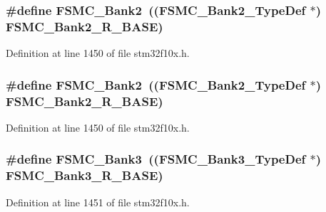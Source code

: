 \subsubsection[{\texorpdfstring{F\+S\+M\+C\+\_\+\+Bank2}{FSMC_Bank2}}]{\setlength{\rightskip}{0pt plus 5cm}\#define F\+S\+M\+C\+\_\+\+Bank2~(({\bf F\+S\+M\+C\+\_\+\+Bank2\+\_\+\+Type\+Def} $\ast$) {\bf F\+S\+M\+C\+\_\+\+Bank2\+\_\+\+R\+\_\+\+B\+A\+SE})}\hypertarget{group___peripheral__declaration_gabb3dfb5e88694aa2983ecabd33a55e0a}{}\label{group___peripheral__declaration_gabb3dfb5e88694aa2983ecabd33a55e0a}


Definition at line 1450 of file stm32f10x.\+h.

\subsubsection[{\texorpdfstring{F\+S\+M\+C\+\_\+\+Bank2}{FSMC_Bank2}}]{\setlength{\rightskip}{0pt plus 5cm}\#define F\+S\+M\+C\+\_\+\+Bank2~(({\bf F\+S\+M\+C\+\_\+\+Bank2\+\_\+\+Type\+Def} $\ast$) {\bf F\+S\+M\+C\+\_\+\+Bank2\+\_\+\+R\+\_\+\+B\+A\+SE})}\hypertarget{group___peripheral__declaration_gabb3dfb5e88694aa2983ecabd33a55e0a}{}\label{group___peripheral__declaration_gabb3dfb5e88694aa2983ecabd33a55e0a}


Definition at line 1450 of file stm32f10x.\+h.

\subsubsection[{\texorpdfstring{F\+S\+M\+C\+\_\+\+Bank3}{FSMC_Bank3}}]{\setlength{\rightskip}{0pt plus 5cm}\#define F\+S\+M\+C\+\_\+\+Bank3~(({\bf F\+S\+M\+C\+\_\+\+Bank3\+\_\+\+Type\+Def} $\ast$) {\bf F\+S\+M\+C\+\_\+\+Bank3\+\_\+\+R\+\_\+\+B\+A\+SE})}\hypertarget{group___peripheral__declaration_ga411eedc00b5b2b22b494004d4f41b736}{}\label{group___peripheral__declaration_ga411eedc00b5b2b22b494004d4f41b736}


Definition at line 1451 of file stm32f10x.\+h.

